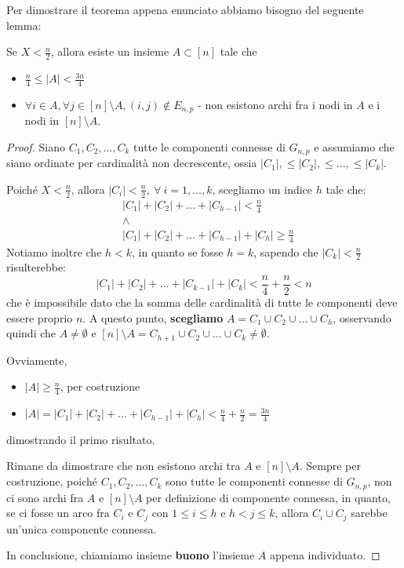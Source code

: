  Per dimostrare il teorema appena enunciato abbiamo bisogno del seguente lemma:

\begin{lemma}\label{lemma1.2}
    Se $X < \frac{n}{2}$, allora esiste un insieme $A \subset [n]$ tale che
    \begin{itemize}
        \item $\frac{n}{4} \leq |A| < \frac{3n}{4}$
        \item $\forall i \in A, \forall j \in [n] \setminus A, (i, j) \notin E_{n,p}$ - non esistono archi fra i nodi in $A$ e i nodi in $[n] \setminus A$.
    \end{itemize}
    
    \begin{proof}
        Siano $C_1, C_2, \dots, C_k$ tutte le componenti connesse di $G_{n,p}$ e assumiamo che siano ordinate per cardinalità non decrescente, ossia $|C_1|, \leq |C_2|, \leq \dots, \leq |C_k|$.
        
         Poiché $X < \frac{n}{2}$, allora $|C_i| < \frac{n}{2},\ \forall\ i=1, \dots, k$, scegliamo un indice $h$ tale che: 
        \[
        \begin{aligned}
        & |C_1| + |C_2|+ \dots+ |C_{h-1}| < \frac{n}{4} \\ 
        & \land\\
        & |C_1| + |C_2|+ \dots+ |C_{h-1}| + |C_h| \geq \frac{n}{4}
        \end{aligned}
        \]
        Notiamo inoltre che $h < k$, in quanto se fosse $h = k$, sapendo che $|C_k| < \frac{n}{2}$ risulterebbe:
        \[
        |C_1| + |C_2|+ \dots+ |C_{k-1}| + |C_k| < \frac{n}{4} + \frac{n}{2} < n
        \]
        che è impossibile dato che la somma delle cardinalità di tutte le componenti deve essere proprio $n$.
        A questo punto, \textbf{scegliamo} $A = C_1 \cup C_2 \cup \dots \cup C_h$, osservando quindi che $A \neq \emptyset$ e $[n] \setminus A = C_{h+1} \cup C_2 \cup \dots \cup C_k \neq \emptyset$.
        
         Ovviamente,
        \begin{itemize}
            \item $|A| \geq \frac{n}{4}$, per costruzione
            \item $|A| = |C_1| + |C_2|+ \dots+ |C_{h-1}| + |C_h| < \frac{n}{4} + \frac{n}{2} = \frac{3n}{4}$
        \end{itemize}
        dimostrando il primo risultato.
        
         Rimane da dimostrare che non esistono archi tra $A$ e $[n] \setminus A$. Sempre per costruzione, poiché $C_1, C_2, \dots, C_k$ sono tutte le componenti connesse di $G_{n,p}$, non ci sono archi fra $A$ e $[n] \setminus A$ per definizione di componente connessa, in quanto, se ci fosse un arco fra $C_i$ e $C_j$ con $1 \leq i \leq h$ e $h < j \leq k$, allora $C_i \cup C_j$ sarebbe un'unica componente connessa.

         In conclusione, chiamiamo insieme \textbf{buono} l'insieme $A$ appena individuato.
    \end{proof}
\end{lemma}

